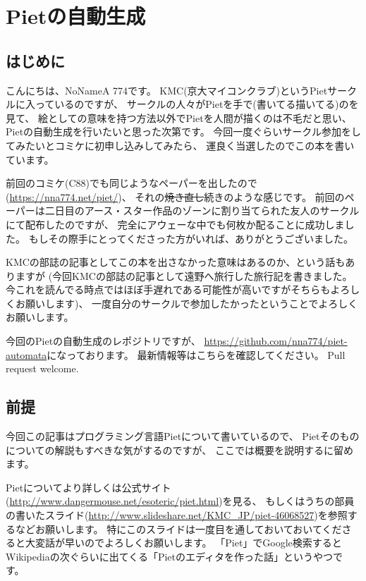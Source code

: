 \chapter[Pietの自動生成]{Pietの自動生成}

\section{はじめに}

こんにちは、NoNameA 774です。
KMC(京大マイコンクラブ)というPietサークルに入っているのですが、
サークルの人々がPietを手で(書いてる\textbar{}描いてる)のを見て、
絵としての意味を持つ方法以外でPietを人間が描くのは不毛だと思い、
Pietの自動生成を行いたいと思った次第です。
今回一度ぐらいサークル参加をしてみたいとコミケに初申し込みしてみたら、
運良く当選したのでこの本を書いています。

前回のコミケ(C88)でも同じようなペーパーを出したので(\url{https://nna774.net/piet/})、
それの\sout{焼き直し}続きのような感じです。
前回のペーパーは二日目のアース・スター作品のゾーンに割り当てられた友人のサークルにて配布したのですが、
完全にアウェーな中でも何枚か配ることに成功しました。
もしその際手にとってくださった方がいれば、ありがとうございました。

KMCの部誌の記事としてこの本を出さなかった意味はあるのか、という話もありますが
(今回KMCの部誌の記事として遠野へ旅行した旅行記を書きました。
今これを読んでる時点ではほぼ手遅れである可能性が高いですがそちらもよろしくお願いします)、
一度自分のサークルで参加したかったということでよろしくお願いします。

今回のPietの自動生成のレポジトリですが、
\url{https://github.com/nna774/piet-automata}になっております。
最新情報等はこちらを確認してください。
Pull request welcome.

\section{前提}

今回この記事はプログラミング言語Pietについて書いているので、
Pietそのものについての解説もすべきな気がするのですが、
ここでは概要を説明するに留めます。

Pietについてより詳しくは公式サイト(\url{http://www.dangermouse.net/esoteric/piet.html})を見る、
もしくはうちの部員の書いたスライド(\url{http://www.slideshare.net/KMC\_JP/piet-46068527})を参照するなどお願いします。
特にこのスライドは一度目を通しておいておいてくださると大変話が早いのでよろしくお願いします。
「Piet」でGoogle検索するとWikipediaの次ぐらいに出てくる「Pietのエディタを作った話」というやつです。

